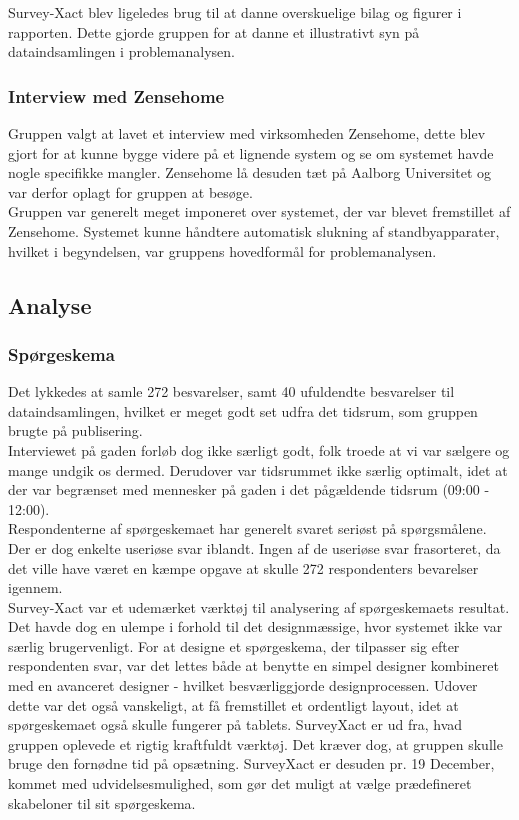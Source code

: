 Survey-Xact blev ligeledes brug til at danne overskuelige bilag og figurer i rapporten. Dette gjorde gruppen for at danne et illustrativt syn på dataindsamlingen i problemanalysen.\\


\subsubsection{Interview med Zensehome} %
Gruppen valgt at lavet et interview med virksomheden Zensehome, dette blev gjort for at kunne bygge videre på et lignende system og se om systemet havde nogle specifikke mangler. Zensehome lå desuden tæt på Aalborg Universitet og var derfor oplagt for gruppen at besøge. \\

Gruppen var generelt meget imponeret over systemet, der var blevet fremstillet af Zensehome. Systemet kunne håndtere automatisk slukning af standbyapparater, hvilket i begyndelsen, var gruppens hovedformål for problemanalysen. \\

\subsection{Analyse}
\subsubsection{Spørgeskema}
Det lykkedes at samle 272 besvarelser, samt 40 ufuldendte besvarelser til dataindsamlingen, hvilket er meget godt set udfra det tidsrum, som gruppen brugte på publisering. \\

Interviewet på gaden forløb dog ikke særligt godt, folk troede at vi var sælgere og mange undgik os dermed. Derudover var tidsrummet ikke særlig optimalt, idet at der var begrænset med mennesker på gaden i det pågældende tidsrum (09:00 - 12:00). \\

Respondenterne af spørgeskemaet har generelt svaret seriøst på spørgsmålene. Der er dog enkelte useriøse svar iblandt. Ingen af de useriøse svar frasorteret, da det ville have været en kæmpe opgave at skulle 272 respondenters bevarelser igennem. \\

Survey-Xact var et udemærket værktøj til analysering af spørgeskemaets resultat. Det havde dog en ulempe i forhold til det designmæssige, hvor systemet ikke var særlig brugervenligt. For at designe et spørgeskema, der tilpasser sig efter respondenten svar, var det lettes både at benytte en simpel designer kombineret med en avanceret designer - hvilket besværliggjorde designprocessen. Udover dette var det også vanskeligt, at få fremstillet et ordentligt layout, idet at spørgeskemaet også skulle fungerer på tablets. SurveyXact er ud fra, hvad gruppen oplevede et rigtig kraftfuldt værktøj. Det kræver dog, at gruppen skulle bruge den fornødne tid på opsætning. SurveyXact er desuden pr. 19 December, kommet med udvidelsesmulighed, som gør det muligt at vælge prædefineret skabeloner til sit spørgeskema.\\

